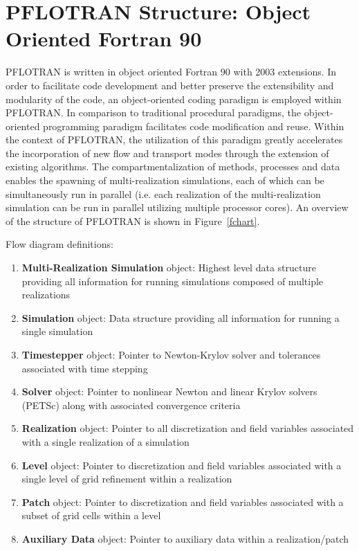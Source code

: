 \documentclass[12pt]{article}
\begin{document}

\section{PFLOTRAN Structure: Object Oriented Fortran 90}

PFLOTRAN is written in object oriented Fortran 90 with 2003 extensions. 
In order to facilitate code development and better preserve the extensibility and modularity of the code, an object-oriented coding paradigm is employed within PFLOTRAN. In comparison to traditional procedural paradigms, the object-oriented programming paradigm facilitates code modification and reuse. Within the context of PFLOTRAN, the utilization of this paradigm greatly accelerates the incorporation of new flow and transport modes through the extension of existing algorithms.  The compartmentalization of methods, processes and data enables the spawning of multi-realization simulations, each of which can be simultaneously run in parallel (i.e. each realization of the multi-realization simulation can be run in parallel utilizing multiple processor cores).
An overview of the structure of PFLOTRAN is shown in Figure~\ref{fchart}.

Flow diagram definitions:
\begin{enumerate}
\item {\bf Multi-Realization Simulation} object: Highest level data structure providing all information for running simulations composed of multiple realizations
\item {\bf Simulation} object: Data structure providing all information for running a single simulation
\item {\bf Timestepper} object: Pointer to Newton-Krylov solver and tolerances associated with time stepping
\item {\bf Solver} object: Pointer to nonlinear Newton and linear Krylov solvers (PETSc) along with associated convergence criteria
\item {\bf Realization} object: Pointer to all discretization and field variables associated with a single realization of a simulation
\item {\bf Level} object: Pointer to discretization and field variables associated with a single level of grid refinement within a realization
\item {\bf Patch} object: Pointer to discretization and field variables associated with a subset of grid cells within a level
\item {\bf Auxiliary Data} object: Pointer to auxiliary data within a realization/patch
\end{enumerate}
\end{document}
